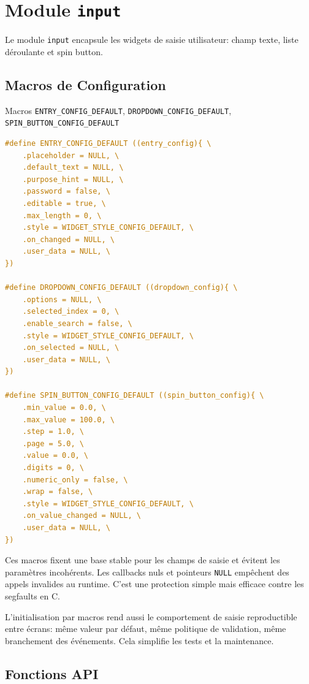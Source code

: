 \section{Module \texttt{input}}

Le module \texttt{input} encapsule les widgets de saisie utilisateur: champ texte, liste déroulante et spin button.

\subsection{Macros de Configuration}

\begin{docbox}{Macros \texttt{ENTRY\_CONFIG\_DEFAULT}, \texttt{DROPDOWN\_CONFIG\_DEFAULT}, \texttt{SPIN\_BUTTON\_CONFIG\_DEFAULT}}
\begin{lstlisting}[language=C]
#define ENTRY_CONFIG_DEFAULT ((entry_config){ \
    .placeholder = NULL, \
    .default_text = NULL, \
    .purpose_hint = NULL, \
    .password = false, \
    .editable = true, \
    .max_length = 0, \
    .style = WIDGET_STYLE_CONFIG_DEFAULT, \
    .on_changed = NULL, \
    .user_data = NULL, \
})

#define DROPDOWN_CONFIG_DEFAULT ((dropdown_config){ \
    .options = NULL, \
    .selected_index = 0, \
    .enable_search = false, \
    .style = WIDGET_STYLE_CONFIG_DEFAULT, \
    .on_selected = NULL, \
    .user_data = NULL, \
})

#define SPIN_BUTTON_CONFIG_DEFAULT ((spin_button_config){ \
    .min_value = 0.0, \
    .max_value = 100.0, \
    .step = 1.0, \
    .page = 5.0, \
    .value = 0.0, \
    .digits = 0, \
    .numeric_only = false, \
    .wrap = false, \
    .style = WIDGET_STYLE_CONFIG_DEFAULT, \
    .on_value_changed = NULL, \
    .user_data = NULL, \
})
\end{lstlisting}
\end{docbox}

Ces macros fixent une base stable pour les champs de saisie et évitent les paramètres incohérents. Les callbacks nuls et pointeurs \texttt{NULL} empêchent des appels invalides au runtime. C'est une protection simple mais efficace contre les segfaults en C.

L'initialisation par macros rend aussi le comportement de saisie reproductible entre écrans: même valeur par défaut, même politique de validation, même branchement des événements. Cela simplifie les tests et la maintenance.

\subsection{Fonctions API}

